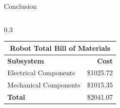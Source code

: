 \documentclass[final]{beamer}
\newlength{\sepwidth}
\newlength{\colwidth}
\newcommand{\separatorcolumn}{\begin{column}{\sepwidth}\end{column}}
\begin{document}
\begin{frame}[t]
\begin{columns}[t]
\begin{column}{\colwidth}
\begin{block}{Conclusion}
\begin{columns}[t]
    \begin{column}{0.3\colwidth}
      \begin{table}[ht]
        \begin{center}
          \label{tab:table1}
          \begin{tabular}{l|r} %
            \toprule
            \multicolumn{2}{c}{\textbf{Robot Total Bill of Materials}} \\
            \midrule
            \cellcolor{white}\textbf{Subsystem} & \cellcolor{white}\textbf{Cost} \\
            \midrule
            Electrical Components & \$1025.72 \\
            Mechanical Components & \$1015.35 \\
            \cellcolor{white}\textbf{Total} & \cellcolor{white}\$2041.07 \\
            \bottomrule
          \end{tabular}
        \end{center}
      \end{table}    
    \end{column}
    
  \end{columns}

  \end{block}

\end{column}

\separatorcolumn
\end{columns}
\end{frame}
\end{document}
